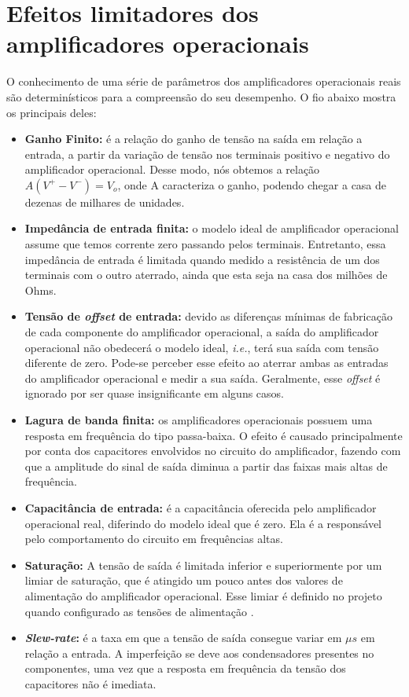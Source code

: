 \section{Efeitos limitadores dos amplificadores operacionais}

O conhecimento de uma série de parâmetros dos amplificadores operacionais reais são determinísticos para a compreensão do seu desempenho. O fio abaixo mostra os principais deles:

\begin{itemize}
    \item \textbf{Ganho Finito:} é a relação do ganho de tensão na saída em relação a entrada, a partir da variação de tensão nos terminais positivo e negativo do amplificador operacional. Desse modo, nós obtemos a relação $A(V^+ - V^-)=V_o$, onde A caracteriza o ganho, podendo chegar a casa de dezenas de milhares de unidades.
    
    \item \textbf{Impedância de entrada finita:} o modelo ideal de amplificador operacional assume que temos corrente zero passando pelos terminais. Entretanto, essa impedância de entrada é limitada quando medido a resistência de um dos terminais com o outro aterrado, ainda que esta seja na casa dos milhões de Ohms.
    
    \item \textbf{Tensão de \emph{offset} de entrada:} devido as diferenças mínimas de fabricação de cada componente do amplificador operacional, a saída do amplificador operacional não obedecerá o modelo ideal, \textit{i.e.}, terá sua saída com tensão diferente de zero. Pode-se perceber esse efeito ao aterrar ambas as entradas do amplificador operacional e medir a sua saída. Geralmente, esse \emph{offset} é ignorado por ser quase insignificante em alguns casos.
    
    \item \textbf{Lagura de banda finita:} os amplificadores operacionais possuem uma resposta em frequência do tipo passa-baixa. O efeito é causado principalmente por conta dos capacitores envolvidos no circuito do amplificador, fazendo com que a amplitude do sinal de saída diminua a partir das faixas mais altas de frequência.
    
    \item \textbf{Capacitância de entrada:} é a capacitância oferecida pelo amplificador operacional real, diferindo do modelo ideal que é zero. Ela é a responsável pelo comportamento do circuito em frequências altas.
    
    \item \textbf{Saturação:} A tensão de saída é limitada inferior e superiormente por um limiar de saturação, que é atingido um pouco antes dos valores de alimentação do amplificador operacional. Esse limiar é definido no projeto quando configurado as tensões de alimentação \cite{dorf}.
    
    \item \textbf{\emph{Slew-rate}:} é a taxa em que a tensão de saída consegue variar em $\mu s$ em relação a entrada. A imperfeição se deve aos condensadores presentes no componentes, uma vez que a resposta em frequência da tensão dos capacitores não é imediata.
\end{itemize}